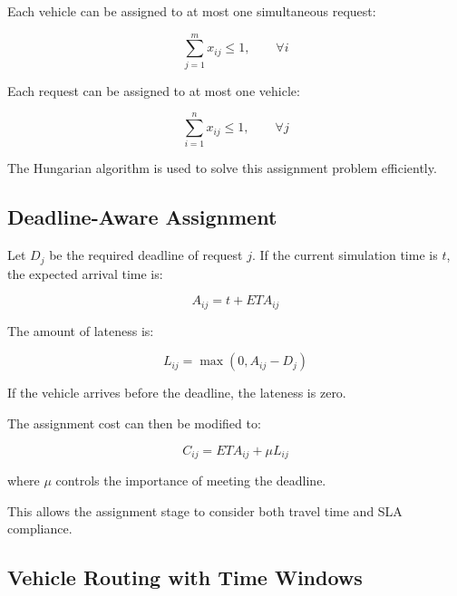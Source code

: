 \documentclass[12pt,a4paper]{article}
\begin{document}
Each vehicle can be assigned to at most one simultaneous request:

\begin{equation}
    \sum_{j=1}^{m}x_{ij}
    \leq 1,
    \qquad
    \forall i
    \label{eq:vehicleconstraint}
\end{equation}

Each request can be assigned to at most one vehicle:

\begin{equation}
    \sum_{i=1}^{n}x_{ij}
    \leq 1,
    \qquad
    \forall j
    \label{eq:requestconstraint}
\end{equation}

The Hungarian algorithm is used to solve this assignment problem
efficiently.





\subsection{Deadline-Aware Assignment}

Let $D_j$ be the required deadline of request $j$. If the current
simulation time is $t$, the expected arrival time is:

\begin{equation}
    A_{ij}
    =
    t+ETA_{ij}
    \label{eq:arrival}
\end{equation}

The amount of lateness is:

\begin{equation}
    L_{ij}
    =
    \max
    \left(
        0,
        A_{ij}-D_j
    \right)
    \label{eq:lateness}
\end{equation}

If the vehicle arrives before the deadline, the lateness is zero.

The assignment cost can then be modified to:

\begin{equation}
    C_{ij}
    =
    ETA_{ij}
    +
    \mu L_{ij}
    \label{eq:deadlinecost}
\end{equation}

where $\mu$ controls the importance of meeting the deadline.

This allows the assignment stage to consider both travel time and
SLA compliance.





\subsection{Vehicle Routing with Time Windows}
\end{document}
